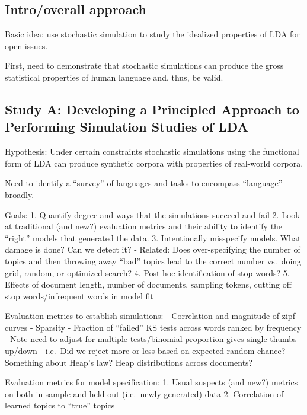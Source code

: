 \documentclass[conference,final,]{IEEEtran}
\begin{document}
\hypertarget{introoverall-approach}{%
\subsection{Intro/overall approach}\label{introoverall-approach}}

Basic idea: use stochastic simulation to study the idealized properties
of LDA for open issues.

First, need to demonstrate that stochastic simulations can produce the
gross statistical properties of human language and, thus, be valid.

\hypertarget{study-a-developing-a-principled-approach-to-performing-simulation-studies-of-lda}{%
\subsection{Study A: Developing a Principled Approach to Performing
Simulation Studies of
LDA}\label{study-a-developing-a-principled-approach-to-performing-simulation-studies-of-lda}}

Hypothesis: Under certain constraints stochastic simulations using the
functional form of LDA can produce synthetic corpora with properties of
real-world corpora.

Need to identify a ``survey'' of languages and tasks to encompass
``language'' broadly.

Goals: 1. Quantify degree and ways that the simulations succeed and fail
2. Look at traditional (and new?) evaluation metrics and their ability
to identify the ``right'' models that generated the data. 3.
Intentionally misspecify models. What damage is done? Can we detect it?
- Related: Does over-specifying the number of topics and then throwing
away ``bad'' topics lead to the correct number vs.~doing grid, random,
or optimized search? 4. Post-hoc identification of stop words? 5.
Effects of document length, number of documents, sampling tokens,
cutting off stop words/infrequent words in model fit

Evaluation metrics to establish simulations: - Correlation and magnitude
of zipf curves - Sparsity - Fraction of ``failed'' KS tests across words
ranked by frequency - Note need to adjust for multiple tests/binomial
proportion gives single thumbs up/down - i.e.~Did we reject more or less
based on expected random chance? - Something about Heap's law? Heap
distributions across documents?

Evaluation metrics for model specification: 1. Usual suspects (and new?)
metrics on both in-sample and held out (i.e.~newly generated) data 2.
Correlation of learned topics to ``true'' topics
\end{document}
